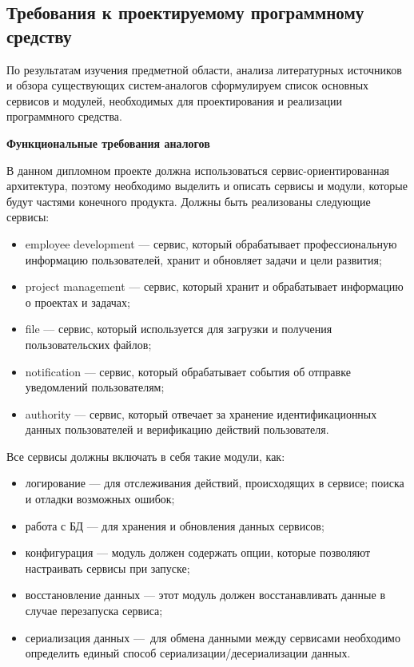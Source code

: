 \subsection{Требования к проектируемому программному средству}\label{sec:analysis:specification}

По результатам изучения предметной области, анализа литературных источников и обзора существующих систем-аналогов сформулируем список основных сервисов и модулей, необходимых для проектирования и реализации программного средства.

\textbf{Функциональные требования аналогов}

В данном дипломном проекте должна использоваться сервис-ориенти\-рованная архитектура, поэтому необходимо выделить и описать сервисы и модули, которые будут частями конечного продукта. Должны быть реализованы следующие сервисы:
\begin{itemize}
    \item employee development — сервис, который обрабатывает профессиональную информацию пользователей, хранит и обновляет задачи и цели развития;
    \item project management — сервис, который хранит и обрабатывает информацию о проектах и задачах;
    \item file — сервис, который используется для загрузки и получения пользовательских файлов;
    \item notification — сервис, который обрабатывает события об отправке уведомлений пользователям;
    \item authority — сервис, который отвечает за хранение идентификационных данных пользователей и верификацию действий пользователя.
\end{itemize}

Все сервисы должны включать в себя такие модули, как:
\begin{itemize}
    \item логирование — для отслеживания действий, происходящих в сервисе; поиска и отладки возможных ошибок;
    \item работа с БД — для хранения и обновления данных сервисов;
    \item конфигурация — модуль должен содержать опции, которые позволяют настраивать сервисы при запуске;
    \item восстановление данных — этот модуль должен восстанавливать данные в случае перезапуска сервиса;
    \item сериализация данных — для обмена данными между сервисами необходимо определить единый способ сериализации/десериализации данных.
\end{itemize}

